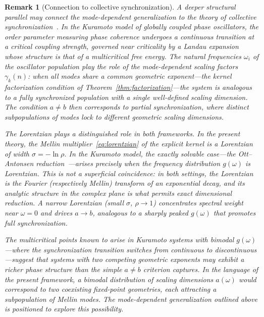 \documentclass[12pt]{article}
\newtheorem{remark}[theorem]{Remark}
\begin{document}
\begin{remark}[Connection to collective synchronization]\label{rem:kuramoto}
A deeper structural parallel may connect the mode-dependent generalization to the theory of collective synchronization~\cite{Kuramoto1984,Strogatz2000}. In the Kuramoto model of globally coupled phase oscillators, the order parameter measuring phase coherence undergoes a continuous transition at a critical coupling strength, governed near criticality by a Landau expansion whose structure is that of a multicritical free energy. The natural frequencies $\omega_i$ of the oscillator population play the role of the mode-dependent scaling factors $\gamma_k(n)$: when all modes share a common geometric exponent---the kernel factorization condition of Theorem~\ref{thm:factorization}---the system is analogous to a fully synchronized population with a single well-defined scaling dimension. The condition $a \neq b$ then corresponds to partial synchronization, where distinct subpopulations of modes lock to different geometric scaling dimensions.

The Lorentzian plays a distinguished role in both frameworks. In the present theory, the Mellin multiplier~\eqref{eq:lorentzian} of the explicit kernel is a Lorentzian of width $\sigma = -\ln\rho$. In the Kuramoto model, the exactly solvable case---the Ott--Antonsen reduction~\cite{OttAntonsen2008}---arises precisely when the frequency distribution $g(\omega)$ is Lorentzian. This is not a superficial coincidence: in both settings, the Lorentzian is the Fourier (respectively Mellin) transform of an exponential decay, and its analytic structure in the complex plane is what permits exact dimensional reduction. A narrow Lorentzian (small $\sigma$, $\rho \to 1$) concentrates spectral weight near $\omega = 0$ and drives $a \to b$, analogous to a sharply peaked $g(\omega)$ that promotes full synchronization.

The multicritical points known to arise in Kuramoto systems with bimodal $g(\omega)$---where the synchronization transition switches from continuous to discontinuous---suggest that systems with two competing geometric exponents may exhibit a richer phase structure than the simple $a \neq b$ criterion captures. In the language of the present framework, a bimodal distribution of scaling dimensions $a(\omega)$ would correspond to two coexisting fixed-point geometries, each attracting a subpopulation of Mellin modes. The mode-dependent generalization outlined above is positioned to explore this possibility.
\end{remark}
\end{document}
